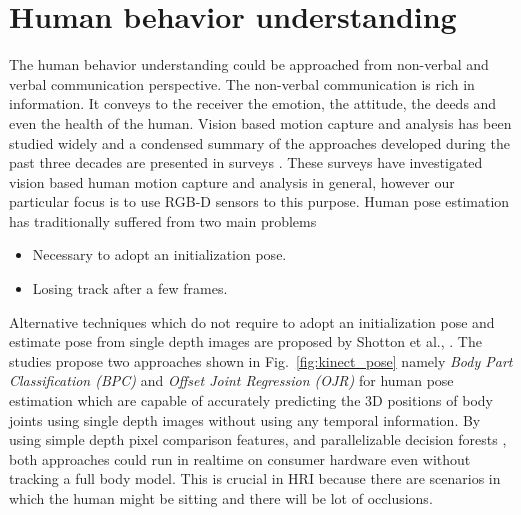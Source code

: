 \section{Human behavior understanding} %
The human behavior understanding could be approached from non-verbal and verbal communication perspective. The non-verbal communication is rich in information. It conveys to the receiver the emotion, the attitude, the deeds and even the health of the human. Vision based motion capture and analysis has been studied widely and a condensed summary of the approaches developed during the past three decades are presented in surveys \cite{Moeslund2001231}\cite{Moeslund200690}\cite{Poppe20074}. These surveys have investigated vision based human motion capture and analysis in general, however our particular focus is to use RGB-D sensors to this purpose. Human pose estimation has traditionally suffered from two main problems
\begin{itemize}[leftmargin={1cm},topsep={0pt},itemsep={0pt},partopsep={0pt},parsep={0pt}] 
\item Necessary to adopt an initialization pose.
\item Losing track after a few frames.
\end{itemize}
Alternative techniques which do not require to adopt an initialization pose and estimate pose from single depth images are proposed by Shotton et al., \cite{shotton2013real} \cite{shotton2013efficient}. The studies propose two approaches shown in Fig.~\ref{fig:kinect_pose} namely \emph{Body Part Classification (BPC)} and \emph{Offset Joint Regression (OJR)} for human pose estimation which are capable of accurately predicting the 3D positions of body joints using single depth images without using any temporal information. By using simple depth pixel comparison features, and parallelizable decision forests \cite{breiman2001random}, both approaches could run in realtime on consumer hardware even without tracking a full body model. This is crucial in HRI because there are scenarios in which the human might be sitting and there will be lot of occlusions. 
